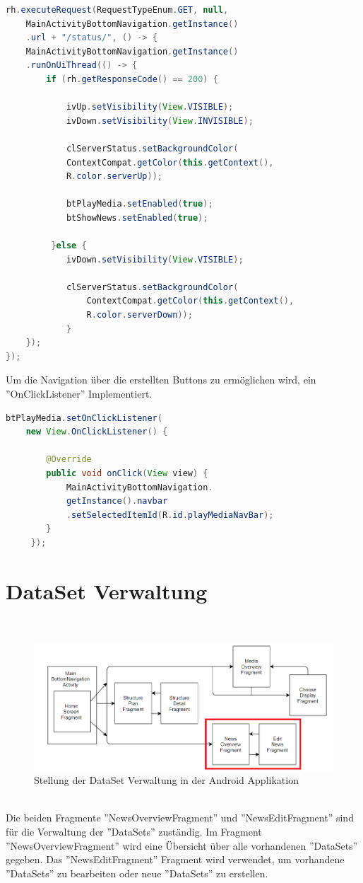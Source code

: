\begin{lstlisting}[language=Java,caption={Status Request im HomeScreenFragment}]
rh.executeRequest(RequestTypeEnum.GET, null,
	MainActivityBottomNavigation.getInstance()
	.url + "/status/", () -> {   
    MainActivityBottomNavigation.getInstance()
    .runOnUiThread(() -> {
      	if (rh.getResponseCode() == 200) {
        	
           	ivUp.setVisibility(View.VISIBLE);
            ivDown.setVisibility(View.INVISIBLE);
                
            clServerStatus.setBackgroundColor(
           	ContextCompat.getColor(this.getContext(),
           	R.color.serverUp));
                	
            btPlayMedia.setEnabled(true);
            btShowNews.setEnabled(true);
                    
         }else {
         	ivDown.setVisibility(View.VISIBLE);
                    
            clServerStatus.setBackgroundColor(
            	ContextCompat.getColor(this.getContext(),
                R.color.serverDown));
            }
    });
});
\end{lstlisting}
Um die Navigation über die erstellten Buttons zu ermöglichen wird, ein ''OnClickListener'' Implementiert.
\begin{lstlisting}[language=Java,caption={OnClickListener für die direkte Navigation über Buttons im HomeScreenFragment}]
btPlayMedia.setOnClickListener(
	new View.OnClickListener() {
            
    	@Override
        public void onClick(View view) {
            MainActivityBottomNavigation.
            getInstance().navbar
            .setSelectedItemId(R.id.playMediaNavBar);
        }
     });
\end{lstlisting}
\section{DataSet Verwaltung}
\\
\begin{figure}[H]
\centering
\includegraphics[width=1.0\textwidth]{images/06_AndroidApp/06_AndroidArchShowNews}
\caption{Stellung der DataSet Verwaltung in der Android Applikation}
\label{fig:mediaNav}
\end{figure}
\\
Die beiden Fragmente  ''NewsOverviewFragment'' und ''NewsEditFragment'' sind für die Verwaltung der ''DataSets'' zuständig. Im Fragment ''NewsOverviewFragment'' wird eine Übersicht über alle vorhandenen ''DataSets'' gegeben. Das ''NewsEditFragment'' Fragment wird verwendet, um vorhandene ''DataSets'' zu bearbeiten oder neue ''DataSets'' zu erstellen. 
